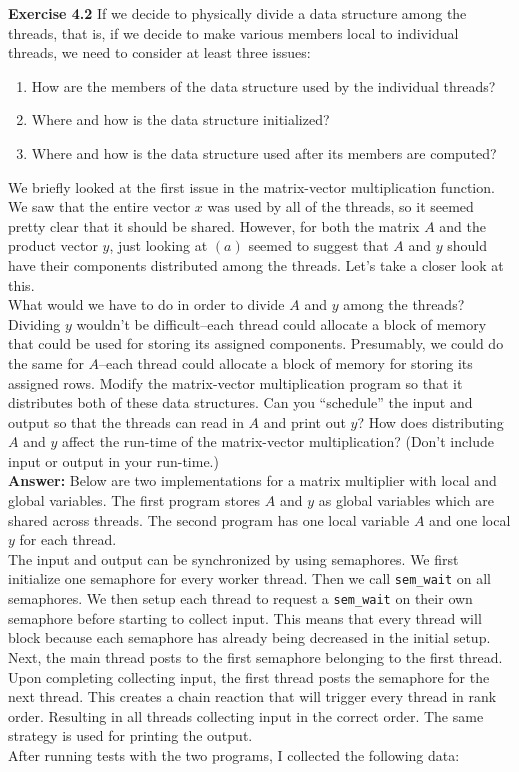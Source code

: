 \documentclass[12pt]{article}
\begin{document}
\pagebreak

\textbf{Exercise 4.2} If we decide to physically divide a data structure among the threads, that is, if we decide to make various members local to individual threads, we need to consider at least three issues:

\begin{enumerate}[label=\alph*.]
    \item How are the members of the data structure used by the individual threads?
    \item Where and how is the data structure initialized?
    \item Where and how is the data structure used after its members are computed?
\end{enumerate}

We briefly looked at the first issue in the matrix-vector multiplication function. We saw that the entire vector $x$ was used by all of the threads, so it seemed pretty clear that it should be shared. However, for both the matrix $A$ and the product vector $y$, just looking at $(a)$ seemed to suggest that $A$ and $y$ should have their components distributed among the threads. Let's take a closer look at this.\\[10pt]
What would we have to do in order to divide $A$ and $y$ among the threads? Dividing $y$ wouldn't be difficult--each thread could allocate a block of memory that could be used for storing its assigned components. Presumably, we could do the same for $A$--each thread could allocate a block of memory for storing its assigned rows. Modify the matrix-vector multiplication program so that it distributes both of these data structures. Can you ``schedule'' the input and output so that the threads can read in $A$ and print out $y$? How does distributing $A$ and $y$ affect the run-time of the matrix-vector multiplication? (Don't include input or output in your run-time.)\\[10pt]

\textbf{Answer:} Below are two implementations for a matrix multiplier with local and global variables. The first program stores $A$ and $y$ as global variables which are shared across threads. The second program has one local variable $A$ and one local $y$ for each thread.\\[10pt]
The input and output can be synchronized by using semaphores. We first initialize one semaphore for every worker thread. Then we call \texttt{sem\_wait} on all semaphores. We then setup each thread to request a \texttt{sem\_wait} on their own semaphore before starting to collect input. This means that every thread will block because each semaphore has already being decreased in the initial setup. Next, the main thread posts to the first semaphore belonging to the first thread. Upon completing collecting input, the first thread posts the semaphore for the next thread. This creates a chain reaction that will trigger every thread in rank order. Resulting in all threads collecting input in the correct order. The same strategy is used for printing the output.\\[10pt]
After running tests with the two programs, I collected the following data:
\end{document}
